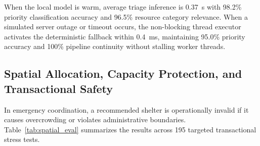 \documentclass[conference]{IEEEtran}
\begin{document}
\begin{table}[htbp]
\caption{Triage and Inference Performance Across Operational Modes.}
\label{tab:triage_eval}
\centering
{}
\end{table}

When the local model is warm, average triage inference is 0.37~s with 98.2\% priority classification accuracy and 96.5\% resource category relevance. When a simulated server outage or timeout occurs, the non-blocking thread executor activates the deterministic fallback within 0.4~ms, maintaining 95.0\% priority accuracy and 100\% pipeline continuity without stalling worker threads.

\subsection{Spatial Allocation, Capacity Protection, and Transactional Safety}
In emergency coordination, a recommended shelter is operationally invalid if it causes overcrowding or violates administrative boundaries. Table~\ref{tab:spatial_eval} summarizes the results across 195 targeted transactional stress tests.

\begin{table}[htbp]
\caption{Spatial Allocation and Capacity Protection Performance.}
\label{tab:spatial_eval}
\centering
{}
\end{table}
\end{document}
